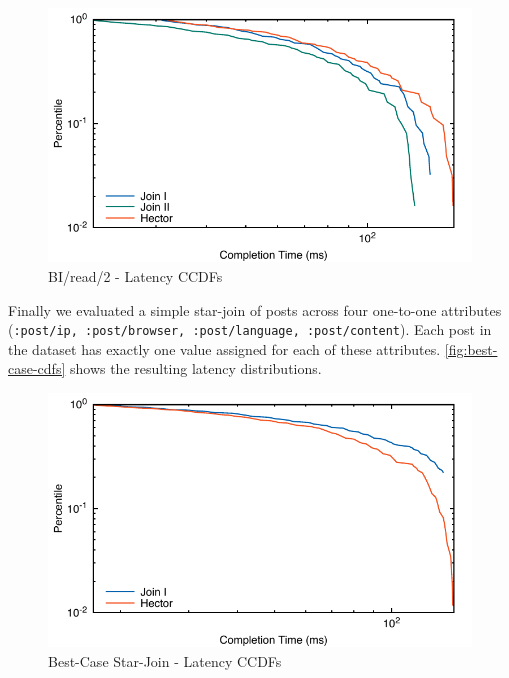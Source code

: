 \documentclass[../catalog.tex]{subfiles}
\begin{document}
\begin{figure}[h!]
  \includegraphics[width=1.0\linewidth]{results/bi_read_2/out/all_cdfs}
  \caption{BI/read/2 - Latency CCDFs}
  \label{fig:average-cdfs}
\end{figure}

Finally we evaluated a simple star-join of posts across four
one-to-one attributes (\texttt{:post/ip, :post/browser,
  :post/language, :post/content}). Each post in the dataset has
exactly one value assigned for each of these
attributes. \autoref{fig:best-case-cdfs} shows the resulting latency
distributions.

\begin{figure}[h!]
  \includegraphics[width=1.0\linewidth]{results/best_case/out/all_cdfs}
  \caption{Best-Case Star-Join - Latency CCDFs}
  \label{fig:best-case-cdfs}
\end{figure}
\end{document}
